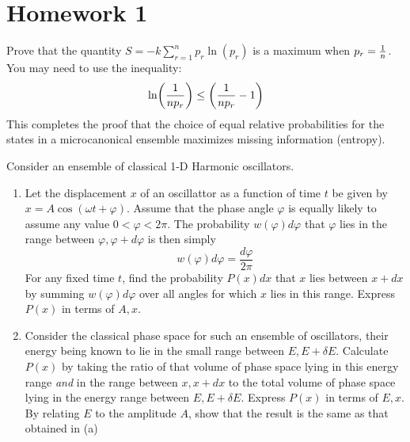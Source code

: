 \documentclass{article}
\date{}
\author{\EC}
\begin{document}
\maketitle
\tableofcontents
\newpage{}
\section{Homework 1}
    \begin{problem}
        Prove that the quantity $\displaystyle S=-k\sum_{r=1}^{n}p_r\ln(p_r)$ is a maximum when $p_r=\oo{n}$. You may need to use the inequality: $$\ln(\oo{np_r})\leq\qty(\oo{np_r}-1)$$
        This completes the proof that the choice of equal relative probabilities for the states in a microcanonical ensemble maximizes missing information (entropy).
        \answerline
    \end{problem}\newpage
    \begin{problem}[Reif 2.3]
        Consider an ensemble of classical 1-D Harmonic oscillators. 
        \begin{enumerate}[label=(\alph*)]
            \item Let the displacement $x$ of an oscillattor as a function of time $t$ be given by $x=A\cos(\omega t+\varphi)$. Assume that the phase angle $\varphi$ is equally likely to assume any value $0<\varphi<2\pi$. The probability $w(\varphi)d\varphi$ that $\varphi$ lies in the range between $\varphi,\varphi+d\varphi$ is then simply $$w(\varphi)d\varphi=\frac{d\varphi}{2\pi}$$For any fixed time $t$, find the probability $P(x)dx$ that $x$ lies between $x+dx$ by summing $w(\varphi)d\varphi$ over all angles for which $x$ lies in this range. Express $P(x)$ in terms of $A,x$. 
            \item Consider the classical phase space for such an ensemble of oscillators, their energy being known to lie in the small range between $E,E+\delta E$. Calculate $P(x)$ by taking the ratio of that volume of phase space lying in this energy range \emph{and} in the range between $x,x+dx$ to the total volume of phase space lying in the energy range between $E,E+\delta E$. Express $P(x)$ in terms of $E,x$. By relating $E$ to the amplitude $A$, show that the result is the same as that obtained in (a)
        \end{enumerate}
        \answerline
    \end{problem}\newpage
\end{document}
